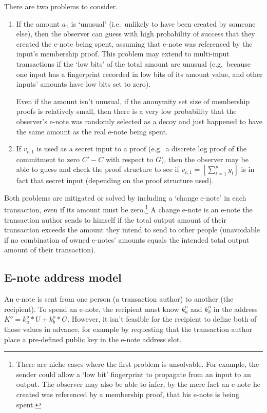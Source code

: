 There are two problems to consider.
\begin{enumerate}
    \item If the amount $a_1$ is `unusual' (i.e.\ unlikely to have been created by someone else), then the observer can guess with high probability of success that they created the e-note being spent, assuming that e-note was referenced by the input's membership proof. This problem may extend to multi-input transactions if the `low bits' of the total amount are unusual (e.g.\ because one input has a fingerprint recorded in low bits of its amount value, and other inputs' amounts have low bits set to zero).

    Even if the amount isn't unusual, if the anonymity set size of membership proofs is relatively small, then there is a very low probability that the observer's e-note was randomly selected as a decoy and just happened to have the same amount as the real e-note being spent.

    \item If $v_{c,1}$ is used as a secret input to a proof (e.g.\ a discrete log proof of the commitment to zero $C' - C$ with respect to $G$), then the observer may be able to guess and check the proof structure to see if $v_{c,1} = [\sum^{p}_{t=1} y_t]$ is in fact that secret input (depending on the proof structure used).
\end{enumerate}

Both problems are mitigated or solved by including a `change e-note' in each transaction, even if its amount must be zero.\footnote{There are niche cases where the first problem is unsolvable. For example, the sender could allow a `low bit' fingerprint to propagate from an input to an output. The observer may also be able to infer, by the mere fact an e-note he created was referenced by a membership proof, that his e-note is being spent.} A change e-note is an e-note the transaction author sends to himself if the total output amount of their transaction exceeds the amount they intend to send to other people (unavoidable if no combination of owned e-notes' amounts equals the intended total output amount of their transaction).


\subsection{E-note address model}
\label{subsec:seraphis-address-model}

An e-note is sent from one person (a transaction author) to another (the recipient). To spend an e-note, the recipient must know $k^o_a$ and $k^o_b$ in the address $K^o = k^o_a*U + k^o_b*G$. However, it isn't feasible for the recipient to define both of those values in advance, for example by requesting that the transaction author place a pre-defined public key in the e-note address slot.

